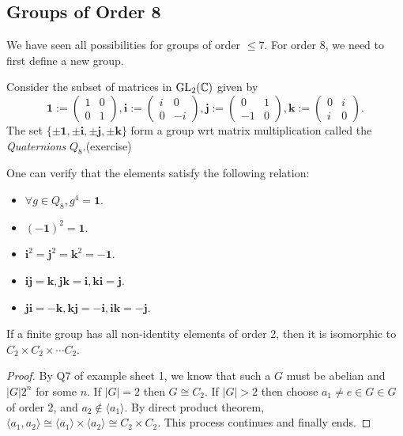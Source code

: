 \documentclass[a4paper]{article}
\begin{document}
\subsection{Groups of Order 8}
We have seen all possibilities for groups of order $\le 7$. For order
8, we need to first define a new group.
\begin{definition}
  Consider the subset of matrices in $ \mathrm{GL}_2(\mathbb{C}) $ given by
  \[
    \mathbf{1}:=
    \begin{pmatrix}
      1&0\\
      0&1
    \end{pmatrix},
    \mathbf{i}:=
    \begin{pmatrix}
      i&0\\
      0&-i
    \end{pmatrix},
    \mathbf{j}:=
    \begin{pmatrix}
      0&1\\
      -1&0
    \end{pmatrix},
    \mathbf{k}:=
    \begin{pmatrix}
      0&i\\
      i&0
    \end{pmatrix}.
  \]
  The set $ \{\pm \mathbf{1},\pm \mathbf{i},\pm \mathbf{j},\pm
  \mathbf{k}\} $ form a group wrt matrix multiplication called the
  \textit{Quaternions} $ Q_8 $.(exercise)
\end{definition}
One can verify that the elements satisfy the following relation:
\begin{itemize}
  \item $ \forall g\in Q_8, g^4=\mathbf{1} $.
  \item $ (-\mathbf{1})^2=\mathbf{1} $.
  \item $ \mathbf{i}^2=\mathbf{j}^2=\mathbf{k}^2=-\mathbf{1} $.
  \item $
    \mathbf{i}\mathbf{j}=\mathbf{k},\mathbf{j}\mathbf{k}=\mathbf{i},\mathbf{k}\mathbf{i}=\mathbf{j}
    $.
  \item $ \mathbf{j}\mathbf{i}=-\mathbf{k},
    \mathbf{k}\mathbf{j}=-\mathbf{i}, \mathbf{i}\mathbf{k}=-\mathbf{j}$.
\end{itemize}
\begin{lemma}\label{lma:8.2}
  If a finite group has all non-identity elements of order 2, then it
  is isomorphic to $ C_2 \times C_2 \times \cdots C_2 $.
\end{lemma}
\begin{proof}
  By Q7 of example sheet 1, we know that such a $G$ must be abelian
  and $|G|2^n$ for some $n$. If $|G|=2$ then $ G \cong C_2 $. If
  $|G|>2$ then choose $a_1\neq e\in G\in G$ of order 2, and
  $a_2\notin \langle a_1 \rangle $. By direct product theorem, $
  \langle a_1,a_2 \rangle \cong \langle a_1 \rangle \times \langle
  a_2 \rangle \cong C_2\times C_2 $. This process continues and finally ends.
\end{proof}
\end{document}

